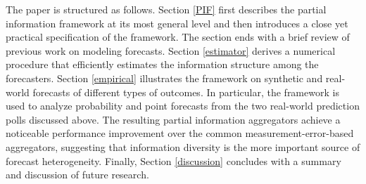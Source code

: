 \documentclass[11pt]{article}
\theoremstyle{definition}
\theoremstyle{definition}
\begin{document}
%





The paper is structured as follows. Section \ref{PIF} first describes the partial information framework at its most general level and then introduces a close yet practical specification of the framework. 
The section ends with a brief review of previous work on modeling forecasts. Section \ref{estimator} derives a numerical procedure that efficiently estimates the information structure among the forecasters. Section \ref{empirical} illustrates the framework on synthetic and real-world forecasts of different types of outcomes. In particular, the framework is used to analyze probability and point forecasts from the two real-world prediction polls discussed above. The resulting partial information aggregators achieve a noticeable performance improvement over the common measurement-error-based aggregators, suggesting that  information diversity is the more important  source of forecast heterogeneity. 
 Finally, Section \ref{discussion} concludes with a summary and discussion of
future research.
\end{document}
